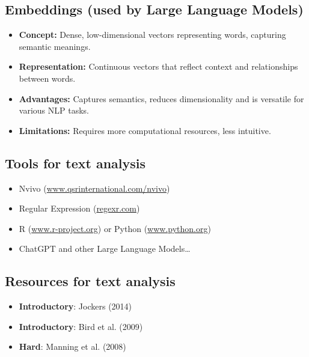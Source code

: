 \documentclass[
  letterpaper,
  DIV=11,
  numbers=noendperiod]{scrartcl}
\providecommand{\tightlist}{%
  \setlength{\itemsep}{0pt}\setlength{\parskip}{0pt}}
\begin{document}
\subsection{Embeddings (used by Large Language
Models)}\label{embeddings-used-by-large-language-models}

\begin{itemize}
\tightlist
\item
  \textbf{Concept:} Dense, low-dimensional vectors representing words,
  capturing semantic meanings.
\item
  \textbf{Representation:} Continuous vectors that reflect context and
  relationships between words.
\item
  \textbf{Advantages:} Captures semantics, reduces dimensionality and is
  versatile for various NLP tasks.
\item
  \textbf{Limitations:} Requires more computational resources, less
  intuitive.
\end{itemize}

\subsection{Tools for text analysis}\label{tools-for-text-analysis}

\begin{itemize}
\item
  Nvivo
  (\href{https://www.qsrinternational.com/nvivo}{www.qsrinternational.com/nvivo})
\item
  Regular Expression (\href{https://regexr.com}{regexr.com})
\item
  R (\href{https://www.r-project.org}{www.r-project.org}) or Python
  (\href{https://www.python.org}{www.python.org})
\item
  ChatGPT and other Large Language Models\ldots{}
\end{itemize}

\subsection{Resources for text
analysis}\label{resources-for-text-analysis}

\begin{itemize}
\item
  \textbf{Introductory}: Jockers (2014)
\item
  \textbf{Introductory}: Bird et al. (2009)
\item
  \textbf{Hard}: Manning et al. (2008)
\end{itemize}
\end{document}
